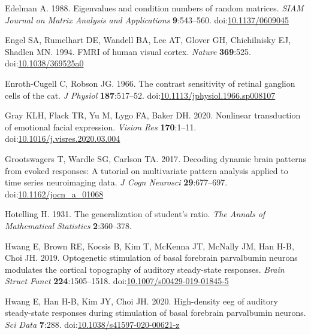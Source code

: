 \documentclass[]{article}
\begin{document}
\leavevmode\hypertarget{ref-Edelman1988}{}%
Edelman A. 1988. Eigenvalues and condition numbers of random matrices. \emph{SIAM Journal on Matrix Analysis and Applications} \textbf{9}:543--560. doi:\href{https://doi.org/10.1137/0609045}{10.1137/0609045}

\leavevmode\hypertarget{ref-Engel1994}{}%
Engel SA, Rumelhart DE, Wandell BA, Lee AT, Glover GH, Chichilnisky EJ, Shadlen MN. 1994. FMRI of human visual cortex. \emph{Nature} \textbf{369}:525. doi:\href{https://doi.org/10.1038/369525a0}{10.1038/369525a0}

\leavevmode\hypertarget{ref-Enroth-Cugell1966}{}%
Enroth-Cugell C, Robson JG. 1966. The contrast sensitivity of retinal ganglion cells of the cat. \emph{J Physiol} \textbf{187}:517--52. doi:\href{https://doi.org/10.1113/jphysiol.1966.sp008107}{10.1113/jphysiol.1966.sp008107}

\leavevmode\hypertarget{ref-Gray2020}{}%
Gray KLH, Flack TR, Yu M, Lygo FA, Baker DH. 2020. Nonlinear transduction of emotional facial expression. \emph{Vision Res} \textbf{170}:1--11. doi:\href{https://doi.org/10.1016/j.visres.2020.03.004}{10.1016/j.visres.2020.03.004}

\leavevmode\hypertarget{ref-Grootswagers2017}{}%
Grootswagers T, Wardle SG, Carlson TA. 2017. Decoding dynamic brain patterns from evoked responses: A tutorial on multivariate pattern analysis applied to time series neuroimaging data. \emph{J Cogn Neurosci} \textbf{29}:677--697. doi:\href{https://doi.org/10.1162/jocn_a_01068}{10.1162/jocn\_a\_01068}

\leavevmode\hypertarget{ref-Hotelling1931}{}%
Hotelling H. 1931. The generalization of student's ratio. \emph{The Annals of Mathematical Statistics} \textbf{2}:360--378.

\leavevmode\hypertarget{ref-Hwang2019}{}%
Hwang E, Brown RE, Kocsis B, Kim T, McKenna JT, McNally JM, Han H-B, Choi JH. 2019. Optogenetic stimulation of basal forebrain parvalbumin neurons modulates the cortical topography of auditory steady-state responses. \emph{Brain Struct Funct} \textbf{224}:1505--1518. doi:\href{https://doi.org/10.1007/s00429-019-01845-5}{10.1007/s00429-019-01845-5}

\leavevmode\hypertarget{ref-Hwang2020}{}%
Hwang E, Han H-B, Kim JY, Choi JH. 2020. High-density eeg of auditory steady-state responses during stimulation of basal forebrain parvalbumin neurons. \emph{Sci Data} \textbf{7}:288. doi:\href{https://doi.org/10.1038/s41597-020-00621-z}{10.1038/s41597-020-00621-z}
\end{document}
